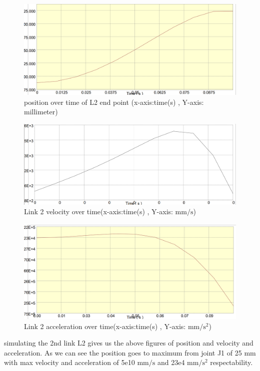 \begin{figure}
    \centering
    \includegraphics[width=1\linewidth]{inventor/L2_position.png}
    \caption{position over time of L2 end point (x-axis:time(s) , Y-axis: millimeter)}
    \label{fig:enter-label}
\end{figure}

\begin{figure}
    \centering
    \includegraphics[width=1\linewidth]{inventor/L2_velocity.png}
    \caption{Link 2 velocity over time(x-axis:time(s) , Y-axis: $\mathrm{mm/s}$)}
    \label{fig:enter-label}
\end{figure}
\begin{figure}
    \centering
    \includegraphics[width=1\linewidth]{inventor/L2_acceleration.png}
    \caption{Link 2 acceleration  over time(x-axis:time(s) , Y-axis: $\mathrm{mm/s^2}$)}
    \label{fig:enter-label}
\end{figure}
simulating the 2nd link L2 gives us the above figures of position and velocity and acceleration. As we can see the position goes to maximum from joint J1 of  25 mm  with max velocity and acceleration of  5e10 $\mathrm{mm/s}$ and 23e4 $\mathrm{mm/s^2}$ respectability.


